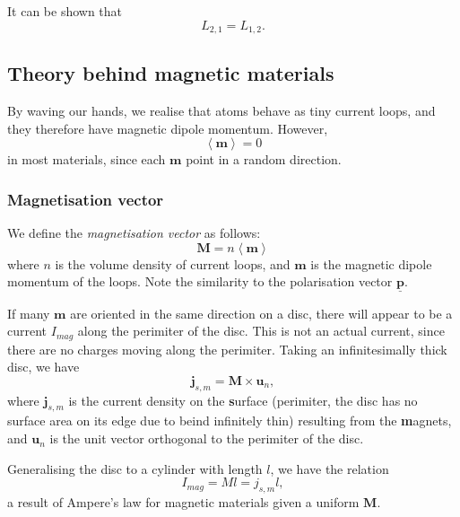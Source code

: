 \documentclass[a4paper, 12pt]{article}
\renewcommand{\vec}[1]{\mathbf{#1}}
\newcommand{\p}{\ensuremath{\vec{\underline{p}}}}
\renewcommand{\j}{\ensuremath{\vec{j}}}
\begin{document}
            It can be shown that 
            \begin{equation}
                L_{2,1} = L_{1,2}.
            \end{equation}

    \subsection{Theory behind magnetic materials}
        By waving our hands, we realise that atoms behave as tiny current loops, and they therefore have magnetic dipole momentum.
        However, 
        \begin{equation*}
            \left<\vec{m}\right> = 0
        \end{equation*}
        in most materials, since each $\vec{m}$ point in a random direction. 

        \subsubsection{Magnetisation vector}
            We define the \textit{magnetisation vector} as follows:
            \begin{equation}
                \vec{M} = n\left<\vec{m}\right>
            \end{equation}
            where $n$ is the volume density of current loops, and $\vec{m}$ is the magnetic dipole momentum of the loops. 
            Note the similarity to the polarisation vector $\p$.

            If many $\vec{m}$ are oriented in the same direction on a disc, 
            there will appear to be a current $I_{mag}$ along the perimiter of the disc. 
            This is not an actual current, since there are no charges moving along the perimiter.
            Taking an infinitesimally thick disc, we have 
            \begin{equation}
                \j_{s, m} = \vec{M}\times\vec{u}_n,
            \end{equation}
            where $\j_{s, m}$ is the current density on the \textbf{s}urface 
            (perimiter, the disc has no surface area on its edge due to beind infinitely thin) 
            resulting from the \textbf{m}agnets, and $\vec{u}_n$ is the unit vector orthogonal to the perimiter of the disc. 

            Generalising the disc to a cylinder with length $l$, we have the relation
            \begin{equation}
                I_{mag} = Ml = j_{s, m}l,
            \end{equation}
            a result of Ampere's law for magnetic materials given a uniform $\vec{M}$.
\end{document}
